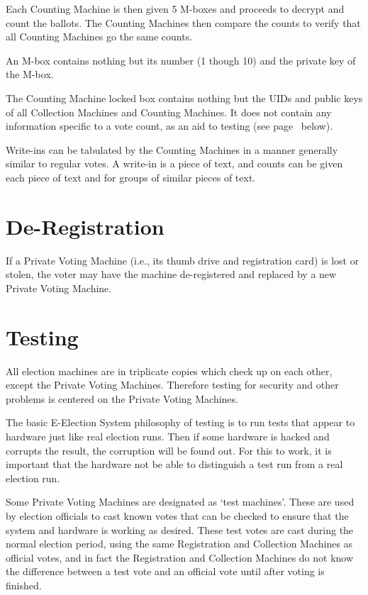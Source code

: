 \documentclass[12pt]{article}
\newcommand{\pagref}[1]{(see page~\pageref{#1} below)}
\begin{document}
Each Counting Machine is then given 5 M-boxes and proceeds to
decrypt and count the ballots.  The Counting Machines then compare
the counts to verify that all Counting Machines go the same counts.

An M-box contains nothing but its number (1 though 10)
and the private key of the M-box.

The Counting Machine locked box contains nothing but the UIDs
and public keys of all Collection Machines and Counting Machines.
It does not contain any information specific to a vote count,
as an aid to testing \pagref{TESTING}.

Write-ins can be tabulated by the Counting Machines in a manner
generally similar to regular votes.  A write-in is a piece of
text, and counts can be given each piece of text and for groups
of similar pieces of text.

\section{De-Registration}

If a Private Voting Machine (i.e., its thumb drive and registration
card) is lost or stolen, the voter may have the machine
de-registered\label{DE-REGISTERED}
and replaced by a new Private Voting Machine.

\section{Testing}\label{TESTING}

All election machines are in triplicate copies which check up on each
other, except the Private Voting Machines.  Therefore testing
for security and other problems is centered on the Private Voting
Machines.

The basic E-Election System philosophy of testing is to run tests
that appear to hardware just like real election runs.  Then if
some hardware is hacked and corrupts the result, the corruption
will be found out.  For this to work, it is important that the
hardware not be able to distinguish a test run from a real election run.

Some Private Voting Machines are designated as
`test machines'\label{TEST-MACHINE}.
These are used by election officials to cast known votes that can
be checked to ensure that the system and hardware is working as
desired.  These test votes are cast during the normal election
period, using the same Registration and Collection Machines
as official votes, and in fact the Registration and Collection Machines
do not know the difference between a test vote and an official vote
until after voting is finished.
\end{document}
